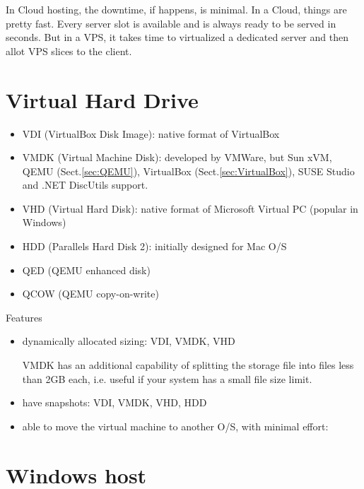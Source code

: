 In Cloud hosting, the downtime, if happens, is minimal. 
In a Cloud, things are pretty fast. Every server slot is available and is always
ready to be served in seconds. But in a VPS, it takes time to virtualized a
dedicated server and then allot VPS slices to the client. 



\section{Virtual Hard Drive}


\begin{itemize}
  \item VDI (VirtualBox Disk Image): native format of VirtualBox
  
  \item VMDK (Virtual Machine Disk): developed by VMWare, but Sun xVM, QEMU
  (Sect.\ref{sec:QEMU}), VirtualBox (Sect.\ref{sec:VirtualBox}), SUSE Studio and
  .NET DiscUtils support.
  
  \item VHD (Virtual Hard Disk): native format of Microsoft Virtual PC (popular
  in Windows)
  
  \item HDD (Parallels Hard Disk 2): initially designed for Mac O/S
  \item QED (QEMU enhanced disk)
  \item QCOW (QEMU copy-on-write)
\end{itemize}

Features
\begin{itemize}
  \item dynamically allocated sizing: VDI, VMDK, VHD
  
  VMDK has an additional capability of splitting the storage file into files
  less than 2GB each, i.e. useful if your system has a small file size limit.
  
  \item have snapshots: VDI, VMDK, VHD, HDD
  
  \item able to move the virtual machine to another O/S, with minimal effort:
\end{itemize}
  
\section{Windows host}

